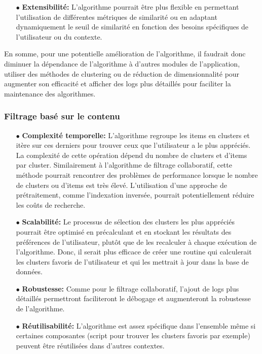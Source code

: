 \documentclass[11pt]{article}
\begin{document}
\begin{itemize}
	\item[$\bullet$] \textbf{Extensibilité:} L'algorithme pourrait être plus flexible en permettant l'utilisation de différentes métriques de similarité ou en adaptant dynamiquement le seuil de similarité en fonction des besoins spécifiques de l'utilisateur ou du contexte.\\
	
\end{itemize}

En somme, pour une potentielle amélioration de l'algorithme, il faudrait donc diminuer la dépendance de l'algorithme à d'autres modules de l'application, utiliser des méthodes de clustering ou de réduction de dimensionnalité pour augmenter son efficacité et afficher des logs plus détaillés pour faciliter la maintenance des algorithmes.

\subsubsection{Filtrage basé sur le contenu}

\begin{itemize}
	\item[$\bullet$] \textbf{Complexité temporelle:} L'algorithme regroupe les items en clusters et itère sur ces derniers pour trouver ceux que l'utilisateur a le plus appréciés. La complexité de cette opération dépend du nombre de clusters et d'items par cluster. Similairement à l'algorithme de filtrage collaboratif, cette méthode pourrait rencontrer des problèmes de performance lorsque le nombre de clusters ou d'items est très élevé. L'utilisation d'une approche de prétraitement, comme l'indexation inversée, pourrait potentiellement réduire les coûts de recherche.\\
	
	\item[$\bullet$] \textbf{Scalabilité:} Le processus de sélection des clusters les plus appréciés pourrait être optimisé en précalculant et en stockant les résultats des préférences de l'utilisateur, plutôt que de les recalculer à chaque exécution de l'algorithme. Donc, il serait plus efficace de créer une routine qui calculerait les clusters favoris de l'utilisateur et qui les mettrait à jour dans la base de données.\\
	
	\item[$\bullet$] \textbf{Robustesse:} Comme pour le filtrage collaboratif, l'ajout de logs plus détaillés permettront faciliteront le débogage et augmenteront la robustesse de l'algorithme.\\

	\item[$\bullet$] \textbf{Réutilisabilité:} L'algorithme est assez spécifique dans l'ensemble même si certaines composantes (script pour trouver les clusters favoris par exemple) peuvent être réutilisées dans d'autres contextes.\\
		
\end{itemize}
\end{document}
